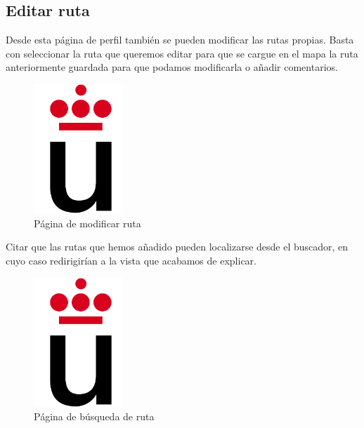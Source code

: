 \documentclass[11pt,a4paper]{article}
\begin{document}
\subsection{Editar ruta}
Desde esta página de perfil también se pueden modificar las rutas propias. Basta con seleccionar la ruta que queremos editar para que se cargue en el mapa la ruta anteriormente guardada para que podamos modificarla o añadir comentarios.
\begin{figure}[h]
\centering
  \includegraphics[width=0.3\textwidth]{./imagenes/logoURJC}
  \caption{Página de modificar ruta}
  \label{fig: Página de modificar ruta}
\end{figure}
Citar que las rutas que hemos añadido pueden localizarse desde el buscador, en cuyo caso redirigirían a la vista que acabamos de explicar.\\

\begin{figure}[h]
\centering
  \includegraphics[width=0.3\textwidth]{./imagenes/logoURJC}
  \caption{Página de búsqueda de ruta}
  \label{fig: Página de búsqueda de ruta}
\end{figure}
\end{document}
